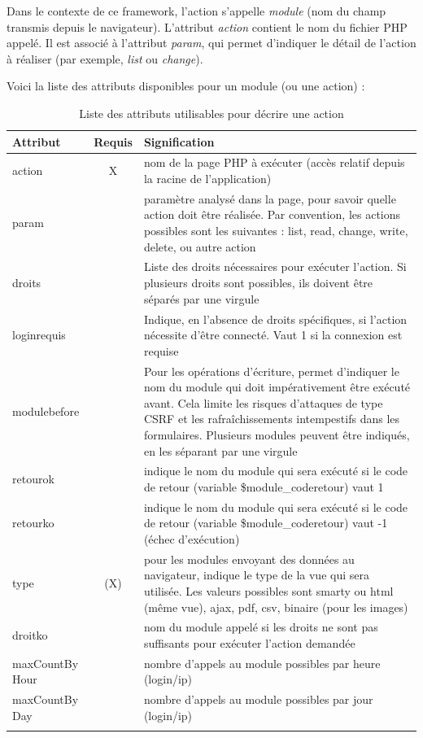 Dans le contexte de ce framework, l'action s'appelle \textit{module} (nom du champ transmis depuis le navigateur). L'attribut \textit{action} contient le nom du fichier PHP appelé. Il est associé à l'attribut \textit{param}, qui permet d'indiquer le détail de l'action à réaliser (par exemple, \textit{list} ou \textit{change}).

Voici la liste des attributs disponibles pour un module (ou une action) :
\begin{longtable}{|p{2.5cm}|c|p{9cm}|}
\hline
\textbf{Attribut} & \textbf{Requis} & \textbf{Signification} \\
\hline
\endhead
\hline\endfoot\endlastfoot
action & X & nom de la page PHP à exécuter (accès relatif depuis la racine de l'application) \\

param &  & paramètre analysé dans la page, pour savoir quelle action doit être réalisée. Par convention, les actions possibles sont les suivantes : list, read, change, write, delete, ou autre action \\

droits &  & Liste des droits nécessaires pour exécuter l'action. Si plusieurs droits sont possibles, ils doivent être séparés par une virgule\\

loginrequis & & Indique, en l'absence de droits spécifiques, si l'action nécessite d'être connecté. Vaut 1 si la connexion est requise\\

modulebefore & & Pour les opérations d'écriture, permet d'indiquer le nom du module qui doit impérativement être exécuté avant. Cela limite les risques d'attaques de type CSRF et les rafraîchissements intempestifs dans les formulaires. Plusieurs modules peuvent être indiqués, en les séparant par une virgule\\

retourok & & indique le nom du module qui sera exécuté si le code de retour (variable \$module\_coderetour) vaut 1 \\

retourko & & indique le nom du module qui sera exécuté si le code de retour (variable \$module\_coderetour) vaut -1 (échec d'exécution) \\

type & (X) & pour les modules envoyant des données au navigateur, indique le type de la vue qui sera utilisée. Les valeurs possibles sont smarty ou html (même vue), ajax, pdf, csv, binaire (pour les images)  \\

droitko & & nom du module appelé si les droits ne sont pas suffisants pour exécuter l'action demandée \\

maxCountBy Hour & & nombre d'appels au module possibles par heure (login/ip) \\
maxCountBy Day & & nombre d'appels au module possibles par jour (login/ip) \\
\hline 
 
 \caption{Liste des attributs utilisables pour décrire une action}\label{actions}
\end{longtable}


